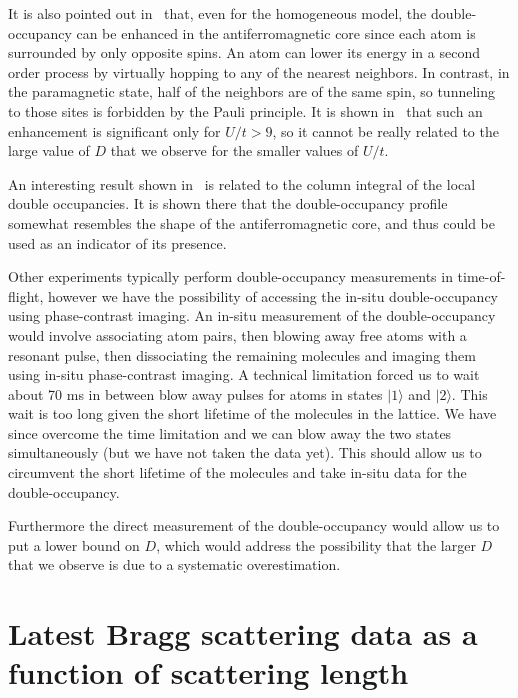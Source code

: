 \documentclass[11pt,letter]{article}
\begin{document}
It is also pointed out in~\cite{Gorelik2010} that, even for the homogeneous
model, the double-occupancy can be enhanced in the antiferromagnetic core since
each atom is surrounded by only opposite spins.  An atom can lower its energy
in a second order process by virtually hopping to any of the nearest neighbors.
In contrast, in the paramagnetic state, half of the neighbors are of the same
spin, so tunneling to those sites is forbidden by the Pauli principle.  It is
shown in~\cite{Gorelik2010} that such an enhancement is significant only
for $U/t > 9$, so it cannot be really related to the large value of $D$ that we
observe for the smaller values of $U/t$. 

An interesting result shown in~\cite{Gorelik2010} is related to the column
integral of the local double occupancies.  It is shown there that the
double-occupancy profile somewhat resembles the shape of the antiferromagnetic
core, and thus could be used as an indicator of its presence.  

Other experiments typically perform double-occupancy measurements in
time-of-flight, however we have the possibility of accessing the in-situ
double-occupancy using phase-contrast imaging.  
An in-situ measurement of the double-occupancy would involve
associating atom pairs, then blowing away free atoms with a resonant pulse,
then dissociating the remaining molecules and imaging them using in-situ
phase-contrast imaging.  A technical limitation forced us to wait about 70 ms
in between blow away pulses for atoms in states $|1\rangle$ and $|2\rangle$.
This wait is too long given the short lifetime of the molecules in the lattice.
We have since overcome the time limitation and we can blow away the two states
simultaneously (but we have not taken the data yet).  This should allow us to
circumvent the short lifetime of the molecules and take in-situ data for the
double-occupancy.   

Furthermore the direct measurement of the double-occupancy would allow us to put
a lower bound on $D$,  which would address the possibility that the larger $D$
that we observe is due to a systematic overestimation.  


\section{ Latest Bragg scattering data as a function of scattering length}
\end{document}
